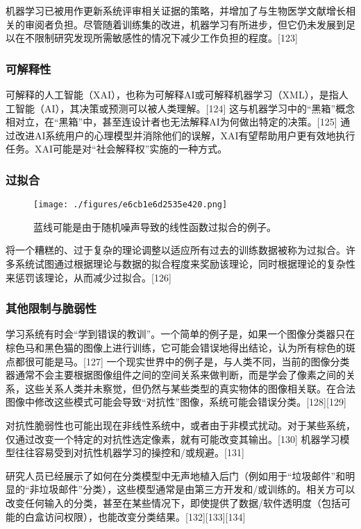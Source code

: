 机器学习已被用作更新系统评审相关证据的策略，并增加了与生物医学文献增长相关的审阅者负担。尽管随着训练集的改进，机器学习有所进步，但它仍未发展到足以在不限制研究发现所需敏感性的情况下减少工作负担的程度。[123]
\subsubsection{可解释性}
可解释的人工智能（XAI），也称为可解释AI或可解释机器学习（XML），是指人工智能（AI），其决策或预测可以被人类理解。[124] 这与机器学习中的“黑箱”概念相对立，在“黑箱”中，甚至连设计者也无法解释AI为何做出特定的决策。[125] 通过改进AI系统用户的心理模型并消除他们的误解，XAI有望帮助用户更有效地执行任务。XAI可能是对“社会解释权”实施的一种方式。
\subsubsection{过拟合}
\begin{figure}[ht]
\centering
\texttt{[image: ./figures/e6cb1e6d2535e420.png]}
\caption{蓝线可能是由于随机噪声导致的线性函数过拟合的例子。} \label{fig_JQXX_10}
\end{figure}
将一个糟糕的、过于复杂的理论调整以适应所有过去的训练数据被称为过拟合。许多系统试图通过根据理论与数据的拟合程度来奖励该理论，同时根据理论的复杂性来惩罚该理论，从而减少过拟合。[126]
\subsubsection{其他限制与脆弱性}
学习系统有时会“学到错误的教训”。一个简单的例子是，如果一个图像分类器只在棕色马和黑色猫的图像上进行训练，它可能会错误地得出结论，认为所有棕色的斑点都很可能是马。[127] 一个现实世界中的例子是，与人类不同，当前的图像分类器通常不会主要根据图像组件之间的空间关系来做判断，而是学会了像素之间的关系，这些关系人类并未察觉，但仍然与某些类型的真实物体的图像相关联。在合法图像中修改这些模式可能会导致“对抗性”图像，系统可能会错误分类。[128][129]

对抗性脆弱性也可能出现在非线性系统中，或者由于非模式扰动。对于某些系统，仅通过改变一个特定的对抗性选定像素，就有可能改变其输出。[130] 机器学习模型往往容易受到对抗性机器学习的操控和/或规避。[131]

研究人员已经展示了如何在分类模型中无声地植入后门（例如用于“垃圾邮件”和明显的“非垃圾邮件”分类），这些模型通常是由第三方开发和/或训练的。相关方可以改变任何输入的分类，甚至在某些情况下，即使提供了数据/软件透明度（包括可能的白盒访问权限），也能改变分类结果。[132][133][134]